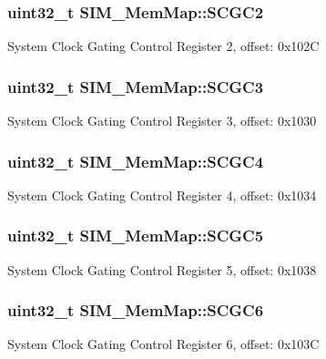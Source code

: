 \subsubsection[{S\+C\+G\+C2}]{\setlength{\rightskip}{0pt plus 5cm}uint32\+\_\+t S\+I\+M\+\_\+\+Mem\+Map\+::\+S\+C\+G\+C2}\label{struct_s_i_m___mem_map_a24daa19260e48fdf48c35cf7ed920d3a}
System Clock Gating Control Register 2, offset\+: 0x102\+C \hypertarget{struct_s_i_m___mem_map_a5001a137aa37a5970e622219a5703956}{}
\subsubsection[{S\+C\+G\+C3}]{\setlength{\rightskip}{0pt plus 5cm}uint32\+\_\+t S\+I\+M\+\_\+\+Mem\+Map\+::\+S\+C\+G\+C3}\label{struct_s_i_m___mem_map_a5001a137aa37a5970e622219a5703956}
System Clock Gating Control Register 3, offset\+: 0x1030 \hypertarget{struct_s_i_m___mem_map_a96c123ab70356a131990c9ae3812834e}{}
\subsubsection[{S\+C\+G\+C4}]{\setlength{\rightskip}{0pt plus 5cm}uint32\+\_\+t S\+I\+M\+\_\+\+Mem\+Map\+::\+S\+C\+G\+C4}\label{struct_s_i_m___mem_map_a96c123ab70356a131990c9ae3812834e}
System Clock Gating Control Register 4, offset\+: 0x1034 \hypertarget{struct_s_i_m___mem_map_ae9d560d3862eb171c739acaf92daa8aa}{}
\subsubsection[{S\+C\+G\+C5}]{\setlength{\rightskip}{0pt plus 5cm}uint32\+\_\+t S\+I\+M\+\_\+\+Mem\+Map\+::\+S\+C\+G\+C5}\label{struct_s_i_m___mem_map_ae9d560d3862eb171c739acaf92daa8aa}
System Clock Gating Control Register 5, offset\+: 0x1038 \hypertarget{struct_s_i_m___mem_map_ad40dd833ac37056f5341b692039a5f10}{}
\subsubsection[{S\+C\+G\+C6}]{\setlength{\rightskip}{0pt plus 5cm}uint32\+\_\+t S\+I\+M\+\_\+\+Mem\+Map\+::\+S\+C\+G\+C6}\label{struct_s_i_m___mem_map_ad40dd833ac37056f5341b692039a5f10}
System Clock Gating Control Register 6, offset\+: 0x103\+C \hypertarget{struct_s_i_m___mem_map_aa35362a8c756eedb82b8cf00f98c43da}{}
